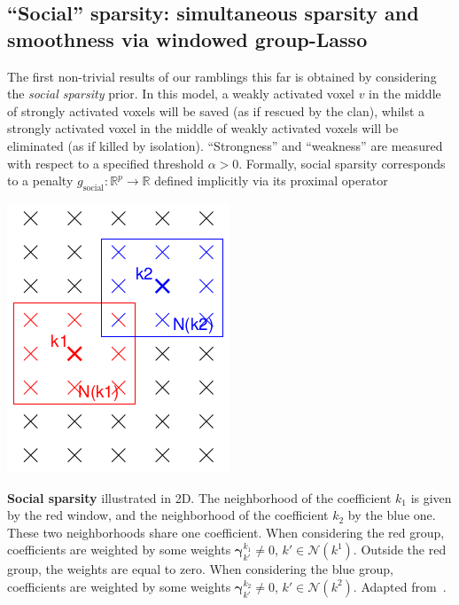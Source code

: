  \subsection{``Social'' sparsity:  simultaneous sparsity and smoothness via windowed group-Lasso}
The first non-trivial results of our ramblings this far is obtained by considering the \textit{social sparsity}  \citep{kowalski2013social,kowalski2009structured} prior. In this model, a weakly activated voxel $v$ in the middle of strongly activated voxels will be saved (as if rescued by the clan), whilst a strongly activated voxel in the middle of weakly activated voxels will be eliminated (as if killed by isolation). ``Strongness'' and ``weakness'' are measured with respect to a specified threshold $\alpha > 0$.
Formally, social sparsity corresponds to a penalty  $g_{\text{social}} : \mathbb R^p \rightarrow \mathbb R$ defined implicitly via its proximal operator

 \begin{marginfigure}
   \includegraphics[width=\linewidth]{figures/social.png}
   \caption{\textbf{Social sparsity} illustrated in 2D. The neighborhood of the coefficient $k_1$ is given by the red
window, and the neighborhood of the coefficient $k_2$ by the blue one. These
two neighborhoods share one coefficient. When considering the red group,
coefficients are weighted by some weights $\boldsymbol{\gamma}_{k'}^{k_1} \ne 0$, $k' \in \mathcal N(k^1)$.
Outside the red group, the weights are equal to zero. When considering the blue group,
coefficients are weighted by some weights $\boldsymbol{\gamma}_{k'}^{k_2} \ne 0$, $k' \in \mathcal N(k^2)$.
Adapted from~\citep{kowalski2013social}.
}
\label{fig:social}
 \end{marginfigure}

